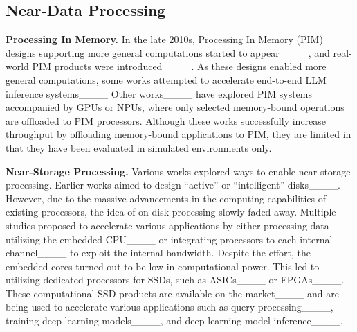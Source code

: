 \subsection{Near-Data Processing}


\textbf{Processing In Memory.}
In the late 2010s, Processing In Memory (PIM) designs supporting more general computations started to appear____, and real-world PIM products were introduced____.
As these designs enabled more general computations, some works attempted to accelerate end-to-end LLM inference systems____
Other works____ have explored PIM systems accompanied by GPUs or NPUs, where only selected memory-bound operations are offloaded to PIM processors.
Although these works successfully increase throughput by offloading memory-bound applications to PIM, they are limited in that they have been evaluated in simulated environments only.

\textbf{Near-Storage Processing.} 
Various works explored ways to enable near-storage processing.
Earlier works aimed to design ``active'' or ``intelligent'' disks____. 
However, due to the massive advancements in the computing capabilities of existing processors, the idea of on-disk processing slowly faded away.
Multiple studies proposed to accelerate various applications by either processing data utilizing the embedded CPU____ or integrating processors to each internal channel____ to exploit the internal bandwidth.
Despite the effort, the embedded cores turned out to be low in computational power.
This led to utilizing dedicated processors for SSDs, such as ASICs____ or FPGAs____.
These computational SSD products are available on the market____ and are being used to accelerate various applications such as query processing____, training deep learning models____, and deep learning model inference____.